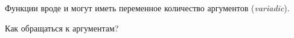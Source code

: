 
Функции вроде \printf и \scanf могут иметь переменное количество аргументов (\emph{variadic}).

Как обращаться к аргументам?






